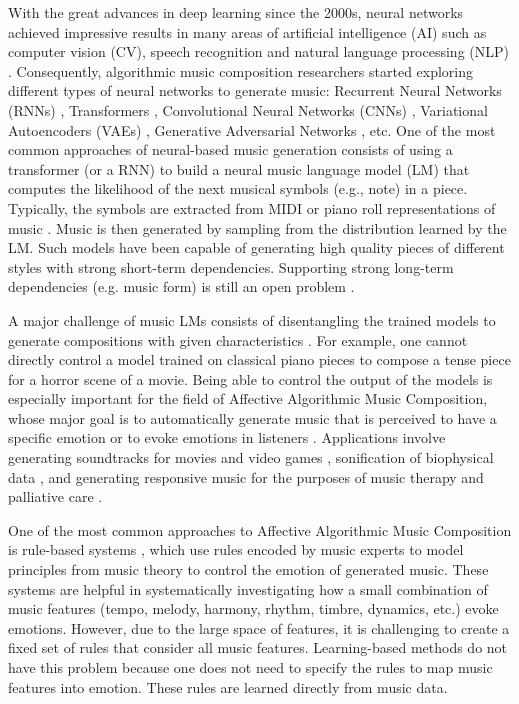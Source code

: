 With the great advances in deep learning since the 2000s, neural networks achieved impressive results in many areas of artificial intelligence (AI) such as computer vision (CV), speech recognition and natural language processing (NLP) \cite{goodfellow2016deep}. Consequently, algorithmic music composition researchers started exploring different types of neural networks to generate music: Recurrent Neural Networks (RNNs) \cite{oore2017learning}, Transformers \cite{huang2018music}, Convolutional Neural Networks (CNNs) \cite{huang2019counterpoint}, Variational Autoencoders (VAEs) \cite{roberts2018hierarchical}, Generative Adversarial Networks \cite{dong2018musegan}, etc. One of the most common approaches of neural-based music generation consists of using a transformer (or a RNN) to build a neural music language model (LM) that computes the likelihood of the next musical symbols (e.g., note) in a piece. Typically, the symbols are extracted from MIDI or piano roll representations of music \cite{briot2017deep}. Music is then generated by sampling from the distribution learned by the LM. Such models have been capable of generating high quality pieces of different styles with strong short-term dependencies. Supporting strong long-term dependencies (e.g. music form) is still an open problem \cite{briot2017deep}.

A major challenge of music LMs consists of disentangling the trained models to generate compositions with given characteristics \cite{ferreira_2019}. For example, one cannot directly control a model trained on classical piano pieces to compose a tense piece for a horror scene of a movie. Being able to control the output of the models is especially important for the field of Affective Algorithmic Music Composition, whose major goal is to automatically generate music that is perceived to have a specific emotion or to evoke emotions in listeners \cite{williams2015investigating}. Applications involve generating soundtracks for movies and video games \cite{williams2015dynamic}, sonification of biophysical data \cite{Chen2015}, and generating responsive music for the purposes of music therapy and palliative care \cite{miranda2011brain}.

One of the most common approaches to Affective Algorithmic Music Composition is rule-based systems \cite{williams2015investigating}, which use rules encoded by music experts to model principles
from music theory to control the emotion of generated music. These systems are helpful in systematically investigating how a small combination of music features (tempo, melody, harmony, rhythm, timbre, dynamics, etc.) evoke emotions. However, due to the large space of features, it is challenging to create a fixed set of rules that consider all music features. Learning-based methods do not have this problem because one does not need to specify the rules to map music features into emotion. These rules are learned directly from music data.

